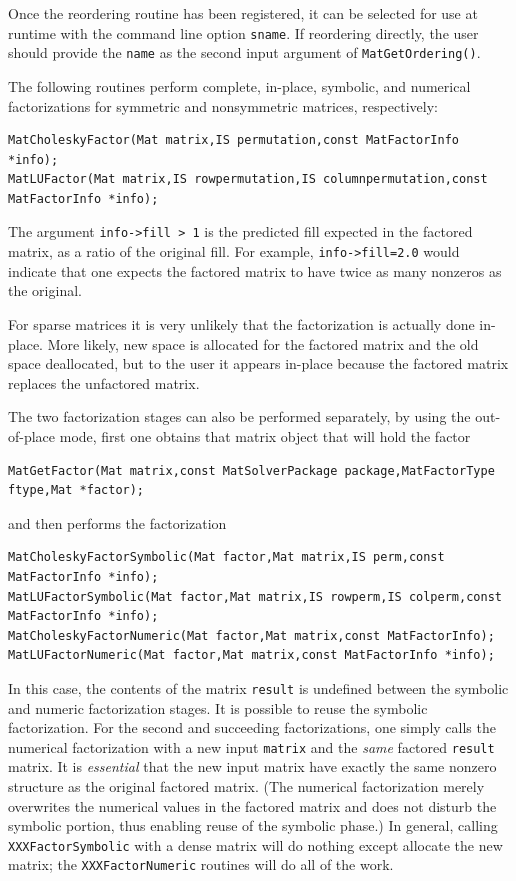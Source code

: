 {{Once the reordering routine has been registered,
it can be selected for use at runtime with the
command line option  \lstinline{sname}.  If reordering directly,
the user should provide the \lstinline{name} as the second input argument of
\lstinline{MatGetOrdering()}.

The following routines perform complete, in-place, symbolic, and numerical
factorizations for symmetric and nonsymmetric matrices, respectively:
\begin{lstlisting}
MatCholeskyFactor(Mat matrix,IS permutation,const MatFactorInfo *info);
MatLUFactor(Mat matrix,IS rowpermutation,IS columnpermutation,const MatFactorInfo *info);
\end{lstlisting}
The argument \lstinline{info->fill > 1} is the predicted fill
expected in the factored matrix, as a ratio of the original fill.
For example, \lstinline{info->fill=2.0} would indicate that one expects the factored
matrix to have twice as many nonzeros as the original.

For sparse matrices it is very unlikely that the factorization
is actually done in-place. More likely, new space is allocated
for the factored matrix and the old space deallocated, but to the
user it appears in-place because the factored matrix replaces
the unfactored matrix.

The 
two
factorization
stages
can also be performed separately, by using the out-of-place mode, first
one obtains that matrix object that will hold the factor
\begin{lstlisting}
MatGetFactor(Mat matrix,const MatSolverPackage package,MatFactorType ftype,Mat *factor);
\end{lstlisting}
and then performs the factorization
\begin{lstlisting}
MatCholeskyFactorSymbolic(Mat factor,Mat matrix,IS perm,const MatFactorInfo *info);
MatLUFactorSymbolic(Mat factor,Mat matrix,IS rowperm,IS colperm,const MatFactorInfo *info);
MatCholeskyFactorNumeric(Mat factor,Mat matrix,const MatFactorInfo);
MatLUFactorNumeric(Mat factor,Mat matrix,const MatFactorInfo *info);
\end{lstlisting}
In this case, the contents of the matrix \lstinline{result} is undefined between
the symbolic and numeric factorization stages.
It is possible to reuse the symbolic factorization. For the second and
succeeding factorizations, one simply calls the numerical factorization with a
new input \lstinline{matrix} and the {\em same} factored \lstinline{result} matrix.
It is {\em essential} that the new input matrix
have   %
exactly the same nonzero structure as the original factored matrix.
(The numerical factorization merely overwrites the numerical values in the
factored matrix and does not disturb the symbolic portion, thus enabling
reuse of the symbolic phase.)
In general, calling \lstinline{XXXFactorSymbolic} with a dense matrix will
do nothing except allocate the new matrix; the \lstinline{XXXFactorNumeric}
routines will do all of the work.

}}
